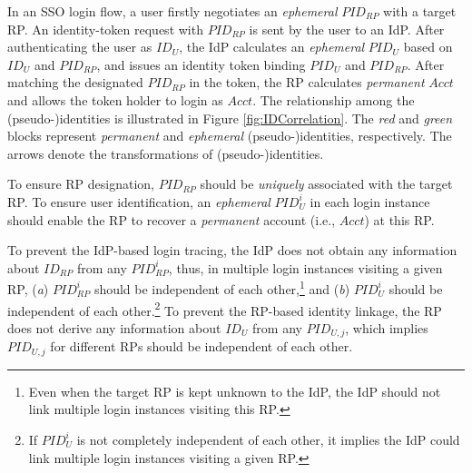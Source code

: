 In an SSO login flow, %
    a user firstly negotiates an \emph{ephemeral} $PID_{RP}$ with a target RP.
An identity-token request with $PID_{RP}$ is sent by the user to an IdP.
After authenticating the user as $ID_U$, the IdP calculates an \emph{ephemeral} $PID_U$ based on $ID_U$ and $PID_{RP}$,
    and issues an identity token binding $PID_U$ and $PID_{RP}$.
After matching the designated $PID_{RP}$ in the token,
    the RP calculates \emph{permanent} $Acct$ and allows the token holder to login as $Acct$.
%
The relationship among the (pseudo-)identities is illustrated in Figure \ref{fig:IDCorrelation}.
The \emph{red} and \emph{green} blocks represent \emph{permanent} and \emph{ephemeral} (pseudo-)identities, respectively.
The arrows denote the transformations of (pseudo-)identities.


To ensure RP designation,
     $PID_{RP}$ should be \emph{uniquely} associated with the target RP.
To ensure user identification,
    an \emph{ephemeral} $PID_{U}^i$ in each login instance should enable the RP to recover a \emph{permanent} account  (i.e., $Acct$) at this RP.


To prevent the IdP-based login tracing,
    the IdP does not obtain any information about $ID_{RP}$ from any $PID_{RP}^i$,
        thus, in multiple login instances visiting a given RP,
           (\emph{a})  $PID_{RP}^i$ should
         be independent of each other,\footnote{Even when the target RP is kept unknown to the IdP,
            the IdP should not link multiple login instances visiting this RP.}
and  (\emph{b}) %
 $PID_U^i$ should be independent of each other.\footnote{If $PID_U^i$ is not completely independent of each other,
         it implies the IdP could link multiple login instances visiting a given RP.}
To prevent the RP-based identity linkage,
    the RP does not derive any information about $ID_U$ from any $PID_{U,j}$,
    which implies $PID_{U,j}$ for different RPs should be independent of each other.



